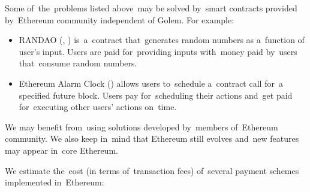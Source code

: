 \documentclass[a4paper]{article}
\begin{document}
    Some of~the~problems listed above~may be solved by~smart contracts provided by~Ethereum community independent of
    Golem. For example:
    \begin{itemize}
        \item RANDAO (\cite{RANDAO}, \cite{RANDAO2}) is~a~contract that~generates random numbers as a~function of
            user's input. Users are paid for~providing inputs with~money paid by~users that~consume random numbers.
        \item Ethereum Alarm Clock (\cite{ALARM}) allows users to~schedule a~contract call for~a specified future
            block. Users pay for~scheduling their actions and~get paid for~executing other users' actions on~time.
    \end{itemize}

    We may benefit from~using solutions developed by~members of~Ethereum community. We also keep in~mind that
    Ethereum still evolves and~new features may appear in~core Ethereum.

    We estimate the~cost (in terms of~transaction fees) of~several payment schemes implemented in~Ethereum:
\end{document}

